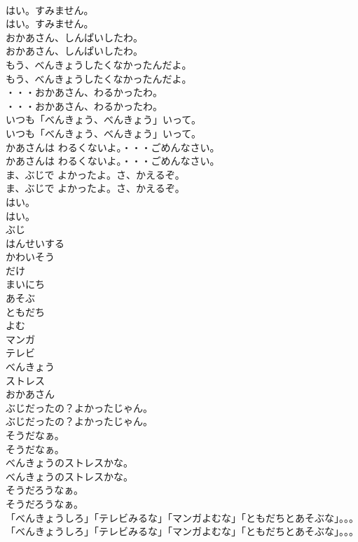 \documentclass[8pt]{extreport}
\begin{document}
\begin{CJK}{UTF8}{min}
\\	はい。すみません。
\\	はい。すみません。
\\	おかあさん、しんぱいしたわ。
\\	おかあさん、しんぱいしたわ。
\\	もう、べんきょうしたくなかったんだよ。
\\	もう、べんきょうしたくなかったんだよ。
\\	・・・おかあさん、わるかったわ。
\\	・・・おかあさん、わるかったわ。
\\	いつも「べんきょう、べんきょう」いって。
\\	いつも「べんきょう、べんきょう」いって。
\\	かあさんは わるくないよ。・・・ごめんなさい。
\\	かあさんは わるくないよ。・・・ごめんなさい。
\\	ま、ぶじで よかったよ。さ、かえるぞ。
\\	ま、ぶじで よかったよ。さ、かえるぞ。
\\	はい。
\\	はい。
\\	ぶじ
\\	はんせいする
\\	かわいそう
\\	だけ
\\	まいにち
\\	あそぶ
\\	ともだち
\\	よむ
\\	マンガ
\\	テレビ
\\	べんきょう
\\	ストレス
\\	おかあさん
\\	ぶじだったの？よかったじゃん。
\\	ぶじだったの？よかったじゃん。
\\	そうだなぁ。
\\	そうだなぁ。
\\	べんきょうのストレスかな。
\\	べんきょうのストレスかな。
\\	そうだろうなぁ。
\\	そうだろうなぁ。
\\	「べんきょうしろ」「テレビみるな」「マンガよむな」「ともだちとあそぶな」。。。
\\	「べんきょうしろ」「テレビみるな」「マンガよむな」「ともだちとあそぶな」。。。

\end{CJK}
\end{document}
